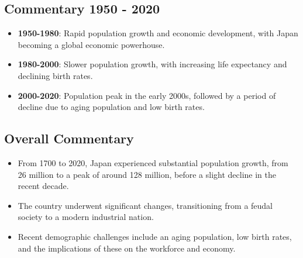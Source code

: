 \subsection*{Commentary 1950 - 2020}
\begin{itemize}
    \item \textbf{1950-1980}: Rapid population growth and economic development, with Japan becoming a global economic powerhouse.
    \item \textbf{1980-2000}: Slower population growth, with increasing life expectancy and declining birth rates.
    \item \textbf{2000-2020}: Population peak in the early 2000s, followed by a period of decline due to aging population and low birth rates.
\end{itemize}

\subsection*{Overall Commentary}
\begin{itemize}
    \item From 1700 to 2020, Japan experienced substantial population growth, from 26 million to a peak of around 128 million, before a slight decline in the recent decade.
    \item The country underwent significant changes, transitioning from a feudal society to a modern industrial nation.
    \item Recent demographic challenges include an aging population, low birth rates, and the implications of these on the workforce and economy.
\end{itemize}